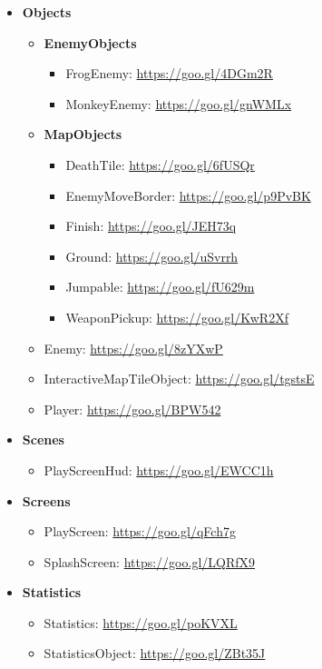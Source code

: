\documentclass[12p]{article}
\begin{document}
\begin{itemize}
    \item \textbf{Objects}
    \begin{itemize}
        \item[\faFolderOpen] \textbf{EnemyObjects}
        \begin{itemize}
            \item FrogEnemy: \url{https://goo.gl/4DGm2R}
            \item MonkeyEnemy: \url{https://goo.gl/gnWMLx}
        \end{itemize}
        
        \item[\faFolderOpen] \textbf{MapObjects}
        \begin{itemize}
            \item DeathTile: \url{https://goo.gl/6fUSQr}
            \item EnemyMoveBorder: \url{https://goo.gl/p9PvBK}
            \item Finish: \url{https://goo.gl/JEH73q}
            \item Ground: \url{https://goo.gl/uSvrrh}
            \item Jumpable: \url{https://goo.gl/fU629m}
            \item WeaponPickup: \url{https://goo.gl/KwR2Xf}
        \end{itemize}
        
        \item Enemy: \url{https://goo.gl/8zYXwP}
        \item InteractiveMapTileObject: \url{https://goo.gl/tgstsE}
        \item Player: \url{https://goo.gl/BPW542}
    \end{itemize}
    
    \item \textbf{Scenes}
    \begin{itemize}
        \item PlayScreenHud: \url{https://goo.gl/EWCC1h}
    \end{itemize}
    
    \item \textbf{Screens}
    \begin{itemize}
        \item PlayScreen: \url{https://goo.gl/qFch7g}
        \item SplashScreen: \url{https://goo.gl/LQRfX9}
    \end{itemize}
    
    \item \textbf{Statistics}
    \begin{itemize}
        \item Statistics: \url{https://goo.gl/poKVXL}
        \item StatisticsObject: \url{https://goo.gl/ZBt35J}
    \end{itemize}
    

\end{itemize}
\end{document}
